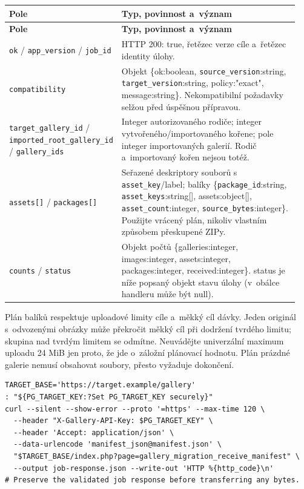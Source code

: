 \documentclass[11pt,a4paper]{article}
\newcommand{\codeword}[1]{\nolinkurl{#1}}
\begin{document}
\begin{longtable}{@{}>{\RaggedRight\arraybackslash}p{0.28\linewidth}>{\RaggedRight\arraybackslash}p{0.67\linewidth}@{}}
\toprule
\textbf{Pole} & \textbf{Typ, povinnost a~význam} \\
\midrule
\endfirsthead
\toprule
\textbf{Pole} & \textbf{Typ, povinnost a~význam} \\
\midrule
\endhead
\bottomrule
\endfoot
\codeword{ok} / \codeword{app_version} / \codeword{job_id} & HTTP 200: true, řetězec verze
cíle a~řetězec identity úlohy. \\
\codeword{compatibility} & Objekt \{ok:boolean, \codeword{source_version}:string,
\codeword{target_version}:string, policy:"exact", message:string\}. Nekompatibilní požadavky
selžou před úspěšnou přípravou. \\
\codeword{target_gallery_id} / \codeword{imported_root_gallery_id} / \codeword{gallery_ids}
& Integer autorizovaného rodiče; integer vytvořeného/importovaného kořene; pole integer
importovaných galerií. Rodič a~importovaný kořen nejsou totéž. \\
\codeword{assets[]} / \codeword{packages[]} & Seřazené deskriptory souborů s
\codeword{asset_key}/label; balíky \{\codeword{package_id}:string,
\codeword{asset_keys}:string[], assets:object[], \codeword{asset_count}:integer,
\codeword{source_bytes}:integer\}. Použijte vrácený plán, nikoliv vlastním způsobem
přeskupené ZIPy. \\
\codeword{counts} / \codeword{status} & Objekt počtů \{galleries:integer, images:integer,
assets:integer, packages:integer, received:integer\}. status je níže popsaný objekt stavu
úlohy (v~obálce handleru může být null). \\
\end{longtable}

Plán balíků respektuje uploadové limity cíle a~měkký cíl dávky. Jeden originál s~odvozenými
obrázky může překročit měkký cíl při dodržení tvrdého limitu; skupina nad tvrdým limitem se
odmítne. Neuvádějte univerzální maximum uploadu 24 MiB jen proto, že jde o~záložní plánovací
hodnotu. Plán prázdné galerie nemusí obsahovat soubory, přesto vyžaduje dokončení.

\begin{lstlisting}[language={}]
TARGET_BASE='https://target.example/gallery'
: "${PG_TARGET_KEY:?Set PG_TARGET_KEY securely}"
curl --silent --show-error --proto '=https' --max-time 120 \
  --header "X-Gallery-API-Key: $PG_TARGET_KEY" \
  --header 'Accept: application/json' \
  --data-urlencode 'manifest_json@manifest.json' \
  "$TARGET_BASE/index.php?page=gallery_migration_receive_manifest" \
  --output job-response.json --write-out 'HTTP %{http_code}\n'
# Preserve the validated job response before transferring any bytes.
\end{lstlisting}
\end{document}
